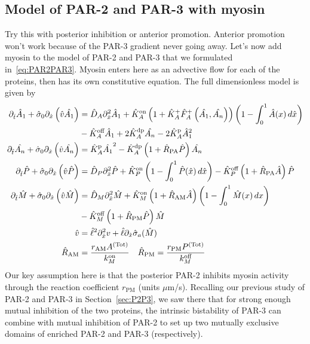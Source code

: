 \documentclass[11pt]{article}
\newcommand{\red}[1]{\color{red}#1\normalcolor}
\newcommand{\6}[1]{#1_{\text{6}}}
\newcommand{\3}[1]{#1_{\text{3}}}
\newcommand{\Tot}[1]{#1^\text{(Tot)}}
\begin{document}
\subsection{Model of PAR-2 and PAR-3 with myosin  \label{sec:P2P3My}}
\red{Try this with posterior inhibition or anterior promotion. Anterior promotion won't work because of the PAR-3 gradient never going away.} Let's now add myosin to the model of PAR-2 and PAR-3 that we formulated in\ \eqref{eq:PAR2PAR3}. Myosin enters here as an advective flow for each of the proteins, then has its own constitutive equation. The full dimensionless model is given by
\begin{subequations}
\label{eq:PAR2PAR3My}
\begin{align}
\nonumber
\Dthat \hat{A}_1 +\hat{\sigma}_0  \Dxhat \left(\hat{v} \hat{\MA} \right)  &=\DhatA \Dxhat^2 \hat{A}_1 +\KhatonA\left(1+\hat{K}_A^+ \hat F_A^+\left(\hat{\MA},\hat{\PA}\right)\right)\left(1 - \int_0^1 \hat{A}(x) \, d\hat{x} \right) \\  
 &-\KhatoffA \hat{A}_1 +2\KhatdpA \hat{\PA}-2 \KhatpA \hat{A}_1^2 \\ 
\Dthat \hat{\PA} +\hat{\sigma}_0  \Dxhat \left(\hat{v} \hat{\PA} \right)  &=\KhatpA \hat{\MA}^2- \KhatdpA \left(1+\hat{R}_\text{PA}\hat{P}\right)\hat{\PA} \\ 
\Dthat \hat{P} +\hat{\sigma}_0  \Dxhat \left(\hat{v} \hat{P} \right) & =\DhatP \Dxhat^2 \hat{P}+\KhatonP \left(1 - \int_0^1 \hat{P}(\hat x) \, d\hat{x} \right)  - \KhatoffP\left(1+\hat{R}_\text{PA} \hat{A}\right)\hat{P} \\ 
\Dthat \hat{M} +\hat{\sigma}_0  \Dxhat \left(\hat{v} \hat{M} \right) &=\hat{D}_M \Dxhat^2 \hat{M} +\KhatonM \left(1+\hat R_\text{AM} \hat{A}\right)\left(1-\int_0^1  \hat{M}(x) \, dx\right)\\ \nonumber &- \KhatoffM\left(1+\hat{R}_\text{PM} \hat{P} \right) \hat{M}\\
\hat{v} &= \hat{\ell}^2 \Dxhat^2 v +\hat{\ell} \Dxhat \hat{\sigma}_a(\hat{M})\\
\hat{R}_\text{AM} &=\frac{r_\text{AM}\Tot{A}}{\kon_M} \quad \hat{R}_\text{PM}=\frac{r_\text{PM}\Tot{P}}{\koff_M}
\end{align}
\end{subequations}
Our key assumption here is that the posterior PAR-2 inhibits myosin activity through the reaction coefficient $r_\text{PM}$ (units $\mu$m/s). Recalling our previous study of PAR-2 and PAR-3 in Section\ \ref{sec:P2P3}, we saw there that for strong enough mutual inhibition of the two proteins, the intrinsic bistability of PAR-3 can combine with mutual inhibition of PAR-2 to set up two mutually exclusive domains of enriched PAR-2 and PAR-3 (respectively). 
\end{document}
